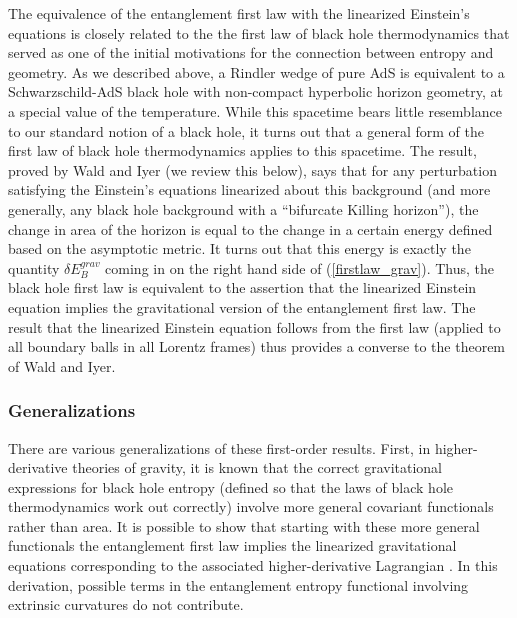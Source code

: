 \documentclass[12pt,epsf]{article}
\begin{document}
The equivalence of the entanglement first law with the linearized Einstein's equations is closely related to the the first law of black hole thermodynamics that served as one of the initial motivations for the connection between entropy and geometry. As we described above, a Rindler wedge of pure AdS is equivalent to a Schwarzschild-AdS black hole with non-compact hyperbolic horizon geometry, at a special value of the temperature. While this spacetime bears little resemblance to our standard notion of a black hole, it turns out that a general form of the first law of black hole thermodynamics applies to this spacetime. The result, proved by Wald and Iyer \cite{Iyer:1994ys} (we review this below), says that for any perturbation satisfying the Einstein's equations linearized about this background (and more generally, any black hole background with a ``bifurcate Killing horizon''), the change in area of the horizon is equal to the change in a certain energy defined based on the asymptotic metric. It turns out that this energy is exactly the quantity $\delta E^{grav}_B$ coming in on the right hand side of (\ref{firstlaw_grav}). Thus, the black hole first law is equivalent to the assertion that the linearized Einstein equation implies the gravitational version of the entanglement first law. The result that the linearized Einstein equation follows from the first law (applied to all boundary balls in all Lorentz frames) thus provides a converse to the theorem of Wald and Iyer.

\subsubsection*{Generalizations}

There are various generalizations of these first-order results. First, in higher-derivative theories of gravity, it is known that the correct gravitational expressions for black hole entropy (defined so that the laws of black hole thermodynamics work out correctly) involve more general covariant functionals rather than area. It is possible to show that starting with these more general functionals the entanglement first law implies the linearized gravitational equations corresponding to the associated higher-derivative Lagrangian \cite{faulkner2014gravitation}. In this derivation, possible terms in the entanglement entropy functional involving extrinsic curvatures do not contribute.
\end{document}
